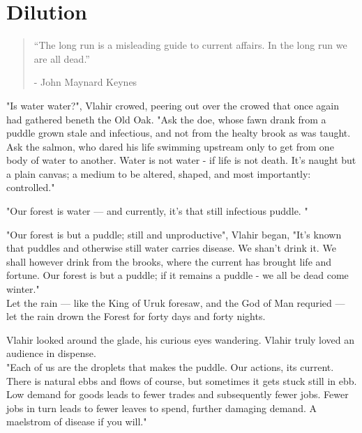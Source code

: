 \chapter{Dilution}

\vspace{-1.3cm}
\begin{localsize}{10}
	\begin{quote}
		“The long run is a misleading guide to current affairs. In the long run we are all dead.” 
		\begin{flushright}- John Maynard Keynes \end{flushright}
	\end{quote} 
\end{localsize}
\vspace{1cm}

"Is water water?", Vlahir crowed, peering out over the crowed that once again had gathered beneth the Old Oak. "Ask the doe, whose fawn drank from a puddle grown stale and infectious, and not from the healty brook as was taught. Ask the salmon, who dared his life swimming upstream only to get from one body of water to another. Water is not water - if life is not death. It's naught but a plain canvas; a medium to be altered, shaped, and most importantly: controlled." 

"Our forest is water — and currently, it's that still infectious puddle.  "

"Our forest is but a puddle; still and unproductive", Vlahir began, "It's known that puddles and otherwise still water carries disease. We shan't drink it.
We shall however drink from the brooks, where the current has brought life and fortune. Our forest is but a puddle; if it remains a puddle - we all be dead come winter."\\


Let the rain — like the King of Uruk foresaw, and the God of Man requried — let the rain drown the Forest for forty days and forty nights.

Vlahir looked around the glade, his curious eyes wandering. Vlahir truly loved an audience in dispense.\\

"Each of us are the droplets that makes the puddle. Our actions, its current. There is natural ebbs and flows of course, but sometimes it gets stuck still in ebb. Low demand for goods leads to fewer trades and subsequently fewer jobs. Fewer jobs in turn leads to fewer leaves to spend, further damaging demand. A maelstrom of disease if you will."\\

